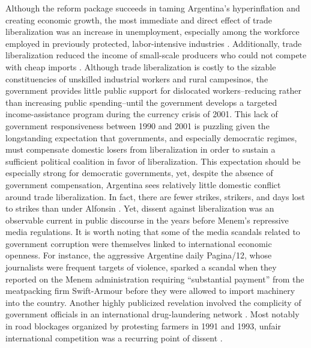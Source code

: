 \documentclass[12pt,a4paper]{article}\usepackage[]{graphicx}\usepackage[]{color}
\begin{document}
Although the reform package succeeds in taming Argentina's hyperinflation and creating economic growth, the most immediate and direct effect of trade liberalization was an increase in unemployment, especially among the workforce employed in previously protected, labor-intensive industries \parencite[10]{Beker:2011vq}. Additionally, trade liberalization reduced the income of small-scale producers who could not compete with cheap imports \parencite{eckstein2001power}. Although trade liberalization is costly to the sizable constituencies of unskilled industrial workers and rural campesinos, the government provides little public support for dislocated workers--reducing rather than increasing public spending--until the government develops a targeted income-assistance program during the currency crisis of 2001. This lack of government responsiveness between 1990 and 2001 is puzzling given the longstanding expectation that governments, and especially democratic regimes, must compensate domestic losers from liberalization in order to sustain a sufficient political coalition in favor of liberalization. This expectation should be especially strong for democratic governments, yet, despite the absence of government compensation, Argentina sees relatively little domestic conflict around trade liberalization. In fact, there are fewer strikes, strikers, and days lost to strikes than under Alfonsin \parencite{eckstein2001power}. Yet, dissent against liberalization was an observable current in public discourse in the years before Menem's repressive media regulations. It is worth noting that some of the media scandals related to government corruption were themselves linked to international economic openness. For instance, the aggressive Argentine daily Pagina/12, whose journalists were frequent targets of violence, sparked a scandal when they reported on the Menem administration requiring ``substantial payment'' from the meatpacking firm Swift-Armour before they were allowed to import machinery into the country. Another highly publicized revelation involved the complicity of government officials in an international drug-laundering network \parencite{Waisbord:1994kq}. Most notably in road blockages organized by protesting farmers in 1991 and 1993, unfair international competition was a recurring point of dissent \parencites{McCullough:1991cs}{Ferber:1993fb}.
\end{document}
